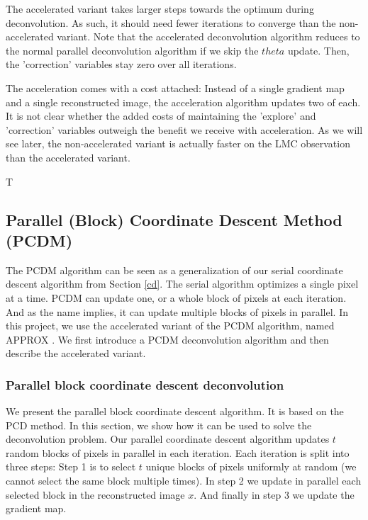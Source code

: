 The accelerated variant takes larger steps towards the optimum during deconvolution. As such, it should need fewer iterations to converge than the non-accelerated variant. Note that the accelerated deconvolution algorithm reduces to the normal parallel deconvolution algorithm if we skip the $theta$ update. Then, the 'correction' variables stay zero over all iterations.

The acceleration comes with a cost attached: Instead of a single gradient map and a single reconstructed image, the acceleration algorithm updates two of each. It is not clear whether the added costs of maintaining the 'explore' and 'correction' variables outweigh the benefit we receive with acceleration. As we will see later, the non-accelerated variant is actually faster on the LMC observation than the accelerated variant.

T



\subsection{Parallel (Block) Coordinate Descent Method (PCDM)} \label{pcdm:pcdm}
The PCDM algorithm can be seen as a generalization of our serial coordinate descent algorithm from Section \ref{cd}. The serial algorithm optimizes a single pixel at a time. PCDM can update one, or a whole block of pixels at each iteration. And as the name implies, it can update multiple blocks of pixels in parallel. In this project, we use the accelerated variant of the PCDM algorithm, named APPROX \cite{fercoq2015accelerated}. We first introduce a PCDM deconvolution algorithm and then describe the accelerated variant.




\subsubsection{Parallel block coordinate descent deconvolution}
We present the parallel block coordinate descent algorithm. It is based on the PCD method\cite{richtarik2016parallel}. In this section, we show how it can be used to solve the deconvolution problem. Our parallel coordinate descent algorithm updates $t$ random blocks of pixels in parallel in each iteration. Each iteration is split into three steps: Step 1 is to select $t$ unique blocks of pixels uniformly at random (we cannot select the same block multiple times). In step 2 we update in parallel each selected block in the reconstructed image $x$. And finally in step 3 we update the gradient map.

